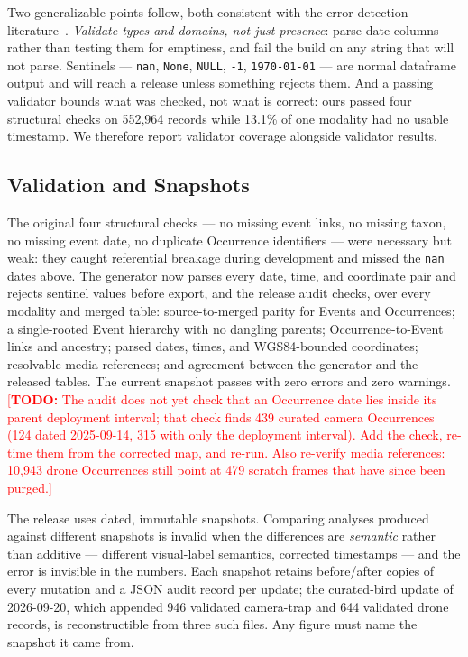 \documentclass[sigconf]{acmart}
\newcommand{\TODO}[1]{\textcolor{red}{\footnotesize[\textbf{TODO:} #1]}}
\newcommand{\TODO}[1]{}
\begin{document}
Two generalizable points follow, both consistent with the
error-detection literature~\cite{abedjan2016detecting,schelter2018deequ}.
\emph{Validate types and domains, not just presence}: parse date columns rather than testing them for
emptiness, and fail the build on any string that will not parse.
Sentinels --- \texttt{nan}, \texttt{None}, \texttt{NULL}, \texttt{-1},
\texttt{1970-01-01} --- are normal dataframe output and will reach a
release unless something rejects them. And a passing validator bounds
what was checked, not what is correct: ours passed four structural checks
on 552{,}964 records while 13.1\% of one modality had no usable
timestamp. We therefore report validator coverage alongside validator
results.

\subsection{Validation and Snapshots}

The original four structural checks --- no missing event links, no
missing taxon, no missing event date, no duplicate Occurrence
identifiers --- were necessary but weak: they caught referential
breakage during development and missed the \texttt{nan} dates above.
The generator now parses every date, time, and coordinate pair and
rejects sentinel values before export, and the release audit checks,
over every modality and merged table: source-to-merged parity for Events
and Occurrences; a single-rooted Event hierarchy with no dangling
parents; Occurrence-to-Event links and ancestry; parsed dates, times,
and WGS84-bounded coordinates; resolvable media references; and
agreement between the generator and the released tables. The current
snapshot passes with zero errors and zero warnings.
\TODO{The audit does not yet check that an Occurrence date lies inside
its parent deployment interval; that check finds 439 curated camera
Occurrences (124 dated 2025-09-14, 315 with only the deployment
interval). Add the check, re-time them from the corrected map, and
re-run. Also re-verify media references: 10{,}943 drone Occurrences
still point at 479 scratch frames that have since been purged.}

The release uses dated, immutable snapshots. Comparing analyses
produced against different snapshots is invalid when the differences
are \emph{semantic} rather than additive --- different visual-label
semantics, corrected timestamps --- and the error is invisible in the
numbers. Each snapshot retains before/after copies of every mutation
and a JSON audit record per update; the
curated-bird update of 2026-09-20, which appended 946 validated
camera-trap and 644 validated drone records, is reconstructible from
three such files. Any figure must name the snapshot it came from.
\end{document}

